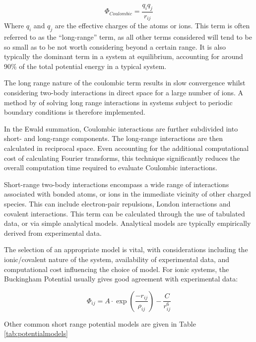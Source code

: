 \begin{equation}
\Phi_{Coulombic} = \frac{q_iq_j}{r_{ij}}
\label{eq:coulombic}
\end{equation}
Where $q_i$ and $q_j$ are the effective charges of the atoms or ions.
This term is often referred to as the ``long-range'' term, as all other terms considered will tend to be so small as to be not worth considering beyond a certain range.
It is also typically the dominant term in a system at equilibrium, accounting for around 90\% of the total potential energy in a typical system.\cite{Catlow2013}

The long range nature of the coulombic term results in slow convergence whilst considering two-body interactions in direct space for a large number of ions.
A method by \citet{Ewald1921} of solving long range interactions in systems subject to periodic boundary conditions is therefore implemented.

In the Ewald summation, Coulombic interactions are further subdivided into short- and long-range components.
The long-range interactions are then calculated in reciprocal space.
Even accounting for the additional computational cost of calculating Fourier transforms, this technique significantly reduces the overall computation time required to evaluate Coulombic interactions.

Short-range two-body interactions encompass a wide range of interactions associated with bonded atoms, or ions in the immediate vicinity of other charged species.
This can include electron-pair repulsions, London interactions and covalent interactions.
This term can be calculated through the use of tabulated data, or via simple analytical models.
Analytical models are typically empirically derived from experimental data.

The selection of an appropriate model is vital, with considerations including the ionic/covalent nature of the system, availability of experimental data, and computational cost influencing the choice of model. For ionic systems, the Buckingham Potential usually gives good agreement with experimental data:


\begin{equation}
\Phi_{ij} = A\cdot \exp \left(\frac{-r_{ij}}{\rho_{ij}} \right) - \frac{C}{r_{ij}^6}
\label{eq:Buckingham}
\end{equation}

Other common short range potential models are given in Table \ref{tab:potentialmodels}

